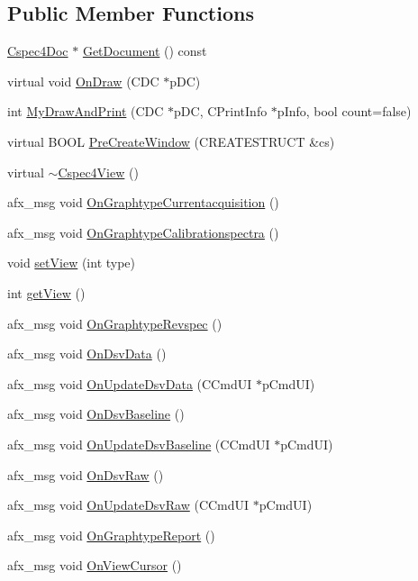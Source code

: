 \subsection*{Public Member Functions}
\begin{DoxyCompactItemize}
\item 
\hyperlink{classCspec4Doc}{Cspec4Doc} $\ast$ \hyperlink{classCspec4View_a5a8a72e1b987ca2e358ed98c04984812}{GetDocument} () const 
\item 
virtual void \hyperlink{classCspec4View_a2bbde04c354e1c5e094ce987a8a5b7d0}{OnDraw} (CDC $\ast$pDC)
\item 
int \hyperlink{classCspec4View_aecbbc6e92491d4bacb6692217263a664}{MyDrawAndPrint} (CDC $\ast$pDC, CPrintInfo $\ast$pInfo, bool count=false)
\item 
virtual BOOL \hyperlink{classCspec4View_a596c6d1be79108318ebd2b9c7dd2a2e2}{PreCreateWindow} (CREATESTRUCT \&cs)
\item 
virtual \hyperlink{classCspec4View_a2ab47a7a294f61873d4811dbe375fb8f}{$\sim$Cspec4View} ()
\item 
afx\_\-msg void \hyperlink{classCspec4View_ab41827ebe49624ca7490ca8c85e713a6}{OnGraphtypeCurrentacquisition} ()
\item 
afx\_\-msg void \hyperlink{classCspec4View_a841c52c57631832b225c05221d19acb7}{OnGraphtypeCalibrationspectra} ()
\item 
void \hyperlink{classCspec4View_a98f3f04413ae1bbb8342a054602d8e1d}{setView} (int type)
\item 
int \hyperlink{classCspec4View_a5b9907d02cab08a82c6a2acd0a86f92c}{getView} ()
\item 
afx\_\-msg void \hyperlink{classCspec4View_a1108920d58418c47668ef3b8b2ed9478}{OnGraphtypeRevspec} ()
\item 
afx\_\-msg void \hyperlink{classCspec4View_a2581c6ce92aa85500194667f7e6e3fe5}{OnDsvData} ()
\item 
afx\_\-msg void \hyperlink{classCspec4View_adbb0512cc1d41eb86cb9d69c71a58323}{OnUpdateDsvData} (CCmdUI $\ast$pCmdUI)
\item 
afx\_\-msg void \hyperlink{classCspec4View_a024f1d3948e352cebb2aff53fe2111ce}{OnDsvBaseline} ()
\item 
afx\_\-msg void \hyperlink{classCspec4View_adcc85f7bb0de30476b35e6daa43a0e7b}{OnUpdateDsvBaseline} (CCmdUI $\ast$pCmdUI)
\item 
afx\_\-msg void \hyperlink{classCspec4View_a4b090581959fdb48adbf28b818af8a03}{OnDsvRaw} ()
\item 
afx\_\-msg void \hyperlink{classCspec4View_a7f7ea3a647f7becf10e31720cc40be48}{OnUpdateDsvRaw} (CCmdUI $\ast$pCmdUI)
\item 
afx\_\-msg void \hyperlink{classCspec4View_a034f00122b1121a577c5c2786432fe59}{OnGraphtypeReport} ()
\item 
afx\_\-msg void \hyperlink{classCspec4View_af8b01a55096a2fd5973177850e2b6d5c}{OnViewCursor} ()
\end{DoxyCompactItemize}
